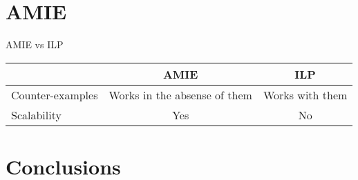 \documentclass{beamer}
\begin{document}

\section{AMIE}
\begin{frame}{AMIE vs ILP}
    
    \begin{tabular}{ l | c | c }
        \toprule
        & AMIE & ILP \\
        \midrule
        Counter-examples & Works in the absense of them & Works with them \\
        Scalability      & Yes  & No\\
        \bottomrule
    \end{tabular}

\end{frame}

\section{Conclusions}
\end{document}
